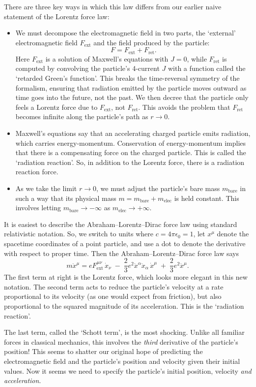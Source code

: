 \documentclass{article}
\newcommand{\bare}{\mathrm{bare}}
\newcommand{\elec}{\mathrm{elec}}
\newcommand{\ret}{\mathrm{ret}}
\newcommand{\ext}{\mathrm{ext}}
\begin{document}
There are three key ways in which this law differs from our earlier naive statement of the Lorentz force law: 
\begin{itemize}
\item 
We must decompose the electromagnetic field in two parts, the `external' electromagnetic field $F_\ext$ and the field produced by the particle:
\[             F = F_\ext + F_\ret .  \]
Here $F_\ext$ is a solution of Maxwell's equations with $J = 0$, while $F_\ret$ is computed by convolving the particle's 4-current $J$ with a function called the `retarded Green's function'.  This breaks the time-reversal symmetry of the formalism, ensuring that radiation emitted by the particle moves outward as time goes into the future, not the past.   We then decree that the particle only feels a Lorentz force due to $F_\ext$, not $F_\ret$.  This avoids the problem that $F_\ret$ becomes infinite along the particle's path as $r \to 0$.
\item
Maxwell's equations say that an accelerating charged particle emits radiation, which carries energy-momentum.   Conservation of energy-momentum implies that there is a compensating force on the charged particle.  This is called the `radiation reaction'.  
So, in addition to the Lorentz force, there is a radiation reaction force.
\item 
As we take the limit $r \to 0$, we must adjust the particle's bare mass $m_\bare$ in 
such a way that its physical mass $m = m_\bare + m_\elec$ is held constant.   This involves letting $m_\bare \to -\infty$ as $m_\elec \to +\infty$.
\end{itemize}

It is easiest to describe the Abraham--Lorentz--Dirac force law using standard relativistic notation.  So, we switch to units where $c = 4 \pi \epsilon_0 = 1$, let $x^\mu$ denote the spacetime coordinates of a point particle, and use a dot to denote the derivative with respect to proper time.  Then the Abraham--Lorentz--Dirac force law says
\[   m \ddot{x}^\mu = e F_{\mathrm{ext}}^{\mu \nu} \,\dot{x}_\nu \; - \; 
\frac{2}{3}e^2 \ddot{x}^\alpha \ddot{x}_\alpha  \, \dot{x}^\mu \; + \; 
\frac{2}{3}e^2 \dddot{x}^\mu .\]
The first term at right is the Lorentz force, which looks more elegant in this new notation.  The second term acts to reduce the particle's velocity at a rate proportional to its velocity (as one would expect from friction), but also proportional to the squared magnitude of its acceleration.  This is the `radiation reaction'.

The last term, called the `Schott term', is the most shocking.  Unlike all familiar forces in classical mechanics, this involves the \emph{third} derivative of the particle's position!  This seems to shatter our original hope of predicting the electromagnetic field and the particle's position and velocity given their initial values.   Now it seems we need to specify the particle's initial position, velocity \emph{and acceleration}.  
\end{document}
